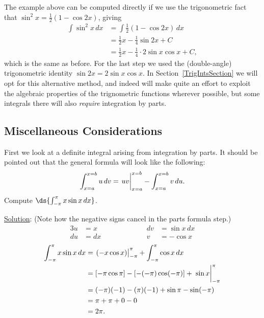 The example above can be computed directly if we use the trigonometric fact
that $\sin^2x=\frac12(1-\cos 2x)$, giving
\begin{align*}\int\sin^2x\,dx&=\int\frac12(1-\cos2x)\,dx\\
        &=\frac12x-\frac14\sin2x+C\\
        &=\frac12x-\frac14\cdot2\sin x\cos x+C,\end{align*}
which is the same as before.  
For the last step we used the (double-angle)
trigonometric identity $\sin2x=2\sin x\cos x$.
In Section~\ref{TrigIntsSection} we will opt for
this alternative method, and indeed will make quite an
effort to exploit the algebraic properties of the trignometric
functions wherever possible, but some integrals there will
also {\it require} integration by parts.






\subsection{Miscellaneous Considerations}
First we look at a definite integral arising from integration by
parts.  It should be pointed out that the general formula
will look like the following:\footnotemark
\begin{equation}
\int_{x=a}^{x=b}u\,dv=\left.\vphantom{\frac11}uv\right|_{x=a}^{x=b}
-\int_{x=a}^{x=b}v\,du.\label{PartsForDefIntsEq}\end{equation}
\bex Compute $\ds{\int_{-\pi}^{\pi}x\sin x\,dx}$.

\underline{Solution}:
(Note how the negative signs cancel in the parts formula step.)
\begin{alignat*}{3}
u&=x&&\qquad\qquad&dv&=\sin x\,dx\\
du&=dx&&&v&=-\cos x\end{alignat*}
\begin{align*}
\int_{-\pi}^{\pi}x\sin x\,dx
  &=\left.\vphantom{X_X^X}(-x\cos x)\right|_{-\pi}^{\pi}
    +\int_{-\pi}^{\pi}\cos x\,dx\\
  &=[-\pi\cos\pi]-[-(-\pi)\cos(-\pi)]+\left.
   \vphantom{\frac11}\sin x\right|_{-\pi}^{\pi}\\
  &=(-\pi)(-1)-(\pi)(-1)+\sin\pi-\sin(-\pi)\\
  &=\pi+\pi+0-0\\
  &=2\pi.\end{align*}
\eex

